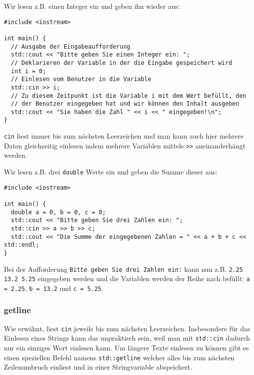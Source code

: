 \documentclass[11pt]{article}
\begin{document}
Wir lesen z.B. einen Integer ein und geben ihn wieder aus:
\begin{verbatim}
#include <iostream>

int main() {
  // Ausgabe der Eingabeaufforderung
  std::cout << "Bitte geben Sie einen Integer ein: ";
  // Deklarieren der Variable in der die Eingabe gespeichert wird
  int i = 0;
  // Einlesen vom Benutzer in die Variable
  std::cin >> i;
  // Zu diesem Zeitpunkt ist die Variable i mit dem Wert befüllt, den
  // der Benutzer eingegeben hat und wir können den Inhalt ausgeben
  std::cout << "Sie haben die Zahl " << i << " eingegeben!\n";
}
\end{verbatim}
\verb~cin~ liest immer bis zum nächsten Leerzeichen und man kann auch hier
mehrere Daten gleichzeitig einlesen indem mehrere Variablen mittels
\verb~>>~ aneinanderhängt werden. 

Wir lesen z.B. drei \verb~double~ Werte ein und geben die Summe dieser aus:
\begin{verbatim}
#include <iostream>

int main() {
  double a = 0, b = 0, c = 0;
  std::cout << "Bitte geben Sie drei Zahlen ein: ";
  std::cin >> a >> b >> c;
  std::cout << "Die Summe der eingegebenen Zahlen = " << a + b + c << std::endl;
}
\end{verbatim}
Bei der Aufforderung \verb~Bitte geben Sie drei Zahlen ein:~ kann nun z.B.
\verb~2.25 13.2 5.25~ eingegeben werden und die Variablen werden der Reihe
nach befüllt: \verb~a = 2.25~, \verb~b = 13.2~ und \verb~c = 5.25~.
\subsubsection{getline}
\label{sec-5-2-1}
Wie erwähnt, liest \verb~cin~ jeweils bis zum nächsten Leerzeichen.
Insbesondere für das Einlesen eines Strings kann das unpraktisch sein,
weil man mit \verb~std::cin~ dadurch nur ein einziges Wort einlesen kann.
Um längere Texte einlesen zu können gibt es einen speziellen Befehl
namens \verb~std::getline~ welcher alles bis zum nächsten Zeilenumbruch
einliest und in einer Stringvariable abspeichert.
\end{document}
